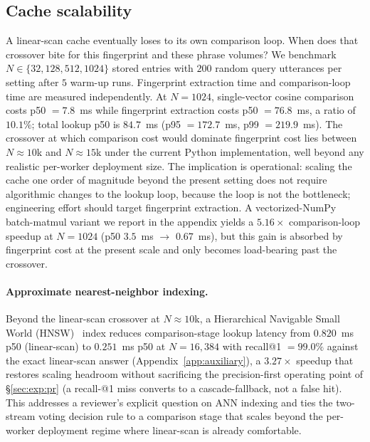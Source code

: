 \documentclass[a4paper,fleqn]{cas-dc}
\begin{document}
\subsection{Cache scalability}\label{sec:exp:scale}

A linear-scan cache eventually loses to its own comparison loop. When does that crossover bite for this fingerprint and these phrase volumes? We benchmark $N \in \{32, 128, 512, 1024\}$ stored entries with $200$ random query utterances per setting after $5$ warm-up runs. Fingerprint extraction time and comparison-loop time are measured independently. At $N = 1024$, single-vector cosine comparison costs p50 $= 7.8$~ms while fingerprint extraction costs p50 $= 76.8$~ms, a ratio of $10.1\%$; total lookup p50 is $84.7$~ms (p95 $= 172.7$~ms, p99 $= 219.9$~ms). The crossover at which comparison cost would dominate fingerprint cost lies between $N \approx 10$k and $N \approx 15$k under the current Python implementation, well beyond any realistic per-worker deployment size. The implication is operational: scaling the cache one order of magnitude beyond the present setting does not require algorithmic changes to the lookup loop, because the loop is not the bottleneck; engineering effort should target fingerprint extraction. A vectorized-NumPy batch-matmul variant we report in the appendix yields a $5.16\times$ comparison-loop speedup at $N = 1024$ (p50 $3.5$~ms $\rightarrow$ $0.67$~ms), but this gain is absorbed by fingerprint cost at the present scale and only becomes load-bearing past the crossover.

\paragraph{Approximate nearest-neighbor indexing.} Beyond the linear-scan crossover at $N \approx 10$k, a Hierarchical Navigable Small World (HNSW)~\citep{malkov2018hnsw} index reduces comparison-stage lookup latency from $0.820$~ms p50 (linear-scan) to $\mathbf{0.251}$~ms p50 at $N = 16{,}384$ with recall@1 $= \mathbf{99.0\%}$ against the exact linear-scan answer (Appendix~\ref{app:auxiliary}), a $3.27\times$ speedup that restores scaling headroom without sacrificing the precision-first operating point of \S\ref{sec:exp:pr} (a recall-@1 miss converts to a cascade-fallback, not a false hit). This addresses a reviewer's explicit question on ANN indexing and ties the two-stream voting decision rule to a comparison stage that scales beyond the per-worker deployment regime where linear-scan is already comfortable.
\end{document}
